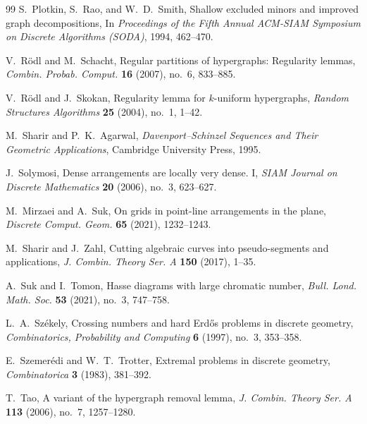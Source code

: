 \documentclass[11pt]{article}
\theoremstyle{plain}
\theoremstyle{definition}
\theoremstyle{remark}
\begin{document}
\begin{thebibliography}{99}
S.~Plotkin, S.~Rao, and W.~D.~Smith,
Shallow excluded minors and improved graph decompositions,
In \emph{Proceedings of the Fifth Annual ACM-SIAM Symposium on Discrete Algorithms (SODA)}, 1994, 462--470.

V.~R\"odl and M.~Schacht,
Regular partitions of hypergraphs: Regularity lemmas,
\emph{Combin. Probab. Comput.} \textbf{16} (2007), no.~6, 833--885.

V.~R\"odl and J.~Skokan,
Regularity lemma for \(k\)-uniform hypergraphs,
\emph{Random Structures Algorithms} \textbf{25} (2004), no.~1, 1--42.

M.~Sharir and P.~K.~Agarwal,
\emph{Davenport--Schinzel Sequences and Their Geometric Applications},
Cambridge University Press, 1995.

J.~Solymosi,
Dense arrangements are locally very dense. I,
\emph{SIAM Journal on Discrete Mathematics} \textbf{20} (2006), no.~3, 623--627.

M.~Mirzaei and A.~Suk,
On grids in point-line arrangements in the plane,
\emph{Discrete Comput. Geom.} \textbf{65} (2021), 1232--1243.



M.~Sharir and J.~Zahl,
Cutting algebraic curves into pseudo-segments and applications,
\emph{J. Combin. Theory Ser. A} \textbf{150} (2017), 1--35.



A.~Suk and I.~Tomon,
Hasse diagrams with large chromatic number,
\emph{Bull. Lond. Math. Soc.} \textbf{53} (2021), no.~3, 747--758.

L.~A.~Sz{\'e}kely,
Crossing numbers and hard Erd\H{o}s problems in discrete geometry,
\emph{Combinatorics, Probability and Computing} \textbf{6} (1997), no.~3, 353--358.

E.~Szemer\'edi and W.~T.~Trotter,
Extremal problems in discrete geometry,
\emph{Combinatorica} \textbf{3} (1983), 381--392.

T.~Tao,
A variant of the hypergraph removal lemma,
\emph{J. Combin. Theory Ser. A} \textbf{113} (2006), no.~7, 1257--1280.

\end{thebibliography}
\end{document}

